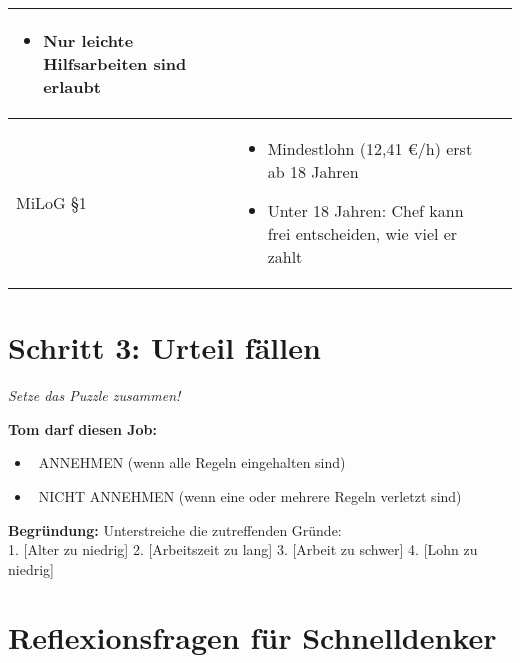 \documentclass[12pt, a4paper]{article}
\newenvironment{taskbox}{%
    \begin{framed}
        \color{black}
    }{%
    \end{framed}
}
\newcommand{\checkbox}{\raisebox{-0.2ex}{\Large$\square$}}
\begin{document}
\begin{taskbox}
\begin{tabular}{|p{4cm}|p{8cm}|p{3cm}|}
\begin{minipage}[t]{8cm}
\begin{itemize}[leftmargin=*,nosep]
                    \item Nur leichte Hilfsarbeiten sind erlaubt
                \end{itemize}
            \end{minipage} & \checkbox \\ 
            \hline
            MiLoG §1 & \begin{minipage}[t]{8cm}
                \begin{itemize}[leftmargin=*,nosep]
                    \item Mindestlohn (12,41 €/h) erst ab 18 Jahren
                    \item Unter 18 Jahren: Chef kann frei entscheiden, wie viel er zahlt
                \end{itemize}
            \end{minipage} & \checkbox \\ 
            \hline
        \end{tabular}
    \end{taskbox}

    \vspace{0.3cm}

    \section*{\color{taskgold}Schritt 3: Urteil fällen}
    
    \begin{taskbox}
        \textit{Setze das Puzzle zusammen!}
        
        \textbf{Tom darf diesen Job:}
        \begin{itemize}[leftmargin=*]
            \item \checkbox\ \textcolor{acceptgreen}{ANNEHMEN} (wenn alle Regeln eingehalten sind)
            \item \checkbox\ \textcolor{rejectred}{NICHT ANNEHMEN} (wenn eine oder mehrere Regeln verletzt sind)
        \end{itemize}
        
        \textbf{Begründung:} Unterstreiche die zutreffenden Gründe:\\
        1. [Alter zu niedrig] 2. [Arbeitszeit zu lang] 3. [Arbeit zu schwer] 4. [Lohn zu niedrig]
    \end{taskbox}

    \vspace{0.3cm}

    \section*{\color{taskgreen}Reflexionsfragen für Schnelldenker}
    
\end{document}
